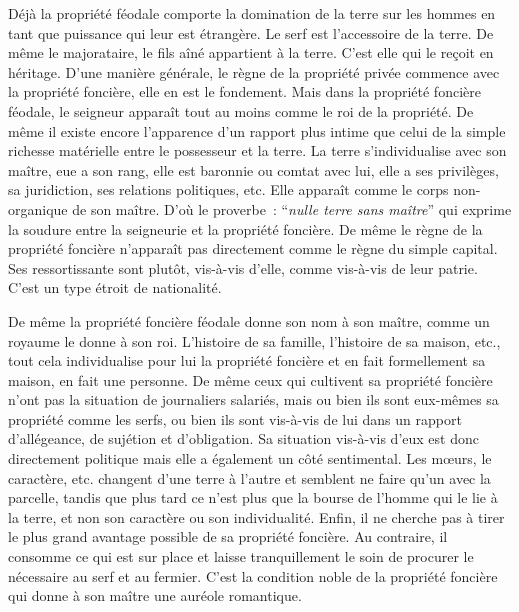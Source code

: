 \documentclass[french,twoside]{book} %
\newcommand\foreign[1]{\emph{#1}}
\begin{document}
Déjà la propriété féodale comporte la domination de la terre sur les hommes en tant que puissance qui leur est étrangère. Le serf est l’accessoire de la terre. De même le majorataire, le fils aîné appartient à la terre. C’est elle qui le reçoit en héritage. D’une manière générale, le règne de la propriété privée commence avec la propriété foncière, elle en est le fondement. Mais dans la propriété foncière féodale, le seigneur apparaît tout au moins comme le roi de la propriété. De même il existe encore l’apparence d’un rapport plus intime que celui de la simple richesse matérielle entre le possesseur et la terre. La terre s’individualise avec son maître, eue a son rang, elle est baronnie ou comtat avec lui, elle a ses privilèges, sa juridiction, ses relations politiques, etc. Elle apparaît comme le corps non-organique de son maître. D’où le proverbe : “\foreign{nulle terre sans maître}” qui exprime la soudure entre la seigneurie et la propriété foncière. De même le règne de la propriété foncière n’apparaît pas directement comme le règne du simple capital. Ses ressortissante sont plutôt, vis-à-vis d’elle, comme vis-à-vis de leur patrie. C’est un type étroit de nationalité.\par
[XVIII] De même la propriété foncière féodale donne son nom à son maître, comme un royaume le donne à son roi. L’histoire de sa famille, l’histoire de sa maison, etc., tout cela individualise pour lui la propriété foncière et en fait formellement sa maison, en fait une personne. De même ceux qui cultivent sa propriété foncière n’ont pas la situation de journaliers salariés, mais ou bien ils sont eux-mêmes sa propriété comme les serfs, ou bien ils sont vis-à-vis de lui dans un rapport d’allégeance, de sujétion et d’obligation. Sa situation vis-à-vis d’eux est donc directement politique mais elle a également un côté sentimental. Les mœurs, le caractère, etc. changent d’une terre à l’autre et semblent ne faire qu’un avec la parcelle, tandis que plus tard ce n’est plus que la bourse de l’homme qui le lie à la terre, et non son caractère ou son individualité. Enfin, il ne cherche pas à tirer le plus grand avantage possible de sa propriété foncière. Au contraire, il consomme ce qui est sur place et laisse tranquillement le soin de procurer le nécessaire au serf et au fermier. C’est la condition noble de la propriété foncière qui donne à son maître une auréole romantique.\par
\end{document}
